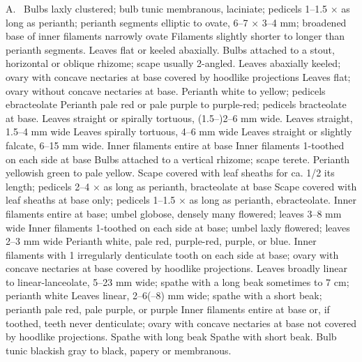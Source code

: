 \documentclass{ctexart}
\begin{document}
\begin{Key*}{A.~}
\alter Bulbs laxly clustered; bulb tunic membranous, laciniate; pedicels 1--1.5 × as long as perianth; perianth segments elliptic to ovate, 6--7 × 3--4 mm; broadened base of inner filaments narrowly ovate
\alter Filaments slightly shorter to longer than perianth segments.
\alter Leaves flat or keeled abaxially.
\alter Bulbs attached to a stout, horizontal or oblique rhizome; scape usually 2-angled.
\alter Leaves abaxially keeled; ovary with concave nectaries at base covered by hoodlike projections
\alter Leaves flat; ovary without concave nectaries at base.
\alter Perianth white to yellow; pedicels ebracteolate
\alter Perianth pale red or pale purple to purple-red; pedicels bracteolate at base.
\alter Leaves straight or spirally tortuous, (1.5--)2--6 mm wide.
\alter Leaves straight, 1.5--4 mm wide
\alter Leaves spirally tortuous, 4--6 mm wide
\alter Leaves straight or slightly falcate, 6--15 mm wide.
\alter Inner filaments entire at base
\alter Inner filaments 1-toothed on each side at base
\alter Bulbs attached to a vertical rhizome; scape terete.
\alter Perianth yellowish green to pale yellow.
\alter Scape covered with leaf sheaths for ca. 1/2 its length; pedicels 2--4 × as long as perianth, bracteolate at base
\alter Scape covered with leaf sheaths at base only; pedicels 1--1.5 × as long as perianth, ebracteolate.
\alter Inner filaments entire at base; umbel globose, densely many flowered; leaves 3--8 mm wide
\alter Inner filaments 1-toothed on each side at base; umbel laxly flowered; leaves 2--3 mm wide
\alter Perianth white, pale red, purple-red, purple, or blue.
\alter Inner filaments with 1 irregularly denticulate tooth on each side at base; ovary with concave nectaries at base covered by hoodlike projections.
\alter Leaves broadly linear to linear-lanceolate, 5--23 mm wide; spathe with a long beak sometimes to 7 cm; perianth white
\alter Leaves linear, 2--6(--8) mm wide; spathe with a short beak; perianth pale red, pale purple, or purple
\alter Inner filaments entire at base or, if toothed, teeth never denticulate; ovary with concave nectaries at base not covered by hoodlike projections.
\alter Spathe with long beak
\alter Spathe with short beak.
\alter Bulb tunic blackish gray to black, papery or membranous.

\end{Key*}
\end{document}
